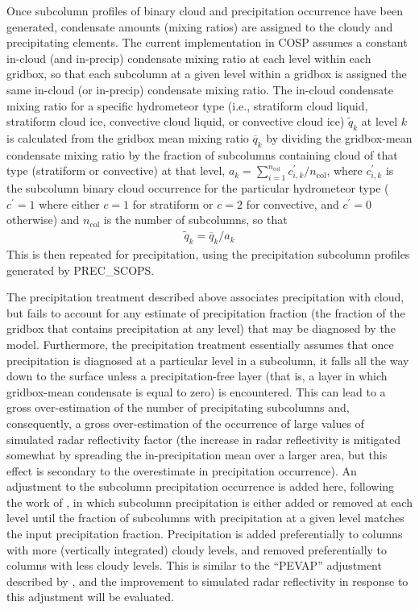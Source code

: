 Once subcolumn profiles of binary cloud and precipitation occurrence
have been generated, condensate amounts (mixing ratios) are assigned to
the cloudy and precipitating elements. The current implementation in
COSP assumes a constant in-cloud (and in-precip) condensate mixing ratio
at each level within each gridbox, so that each subcolumn at a given
level within a gridbox is assigned the same in-cloud (or in-precip)
condensate mixing ratio. The in-cloud condensate mixing ratio for a
specific hydrometeor type (i.e., stratiform cloud liquid, stratiform
cloud ice, convective cloud liquid, or convective cloud ice)
\(\tilde{q}_k\) at level \(k\) is calculated from the gridbox mean
mixing ratio \(\overline{q}_k\) by dividing the gridbox-mean condensate
mixing ratio by the fraction of subcolumns containing cloud of that type
(stratiform or convective) at that level,
\(a_k = \sum_{i = 1}^{n_\textrm{col}} c^\prime_{i, k} / n_\textrm{col}\),
where \(c^{\prime}_{i, k}\) is the subcolumn binary cloud occurrence for
the particular hydrometeor type (\(c^\prime = 1\) where either \(c = 1\)
for stratiform or \(c = 2\) for convective, and \(c^\prime = 0\)
otherwise) and \(n_\textrm{col}\) is the number of subcolumns, so that
\[\begin{gathered} 
    \tilde{q}_k = \overline{q}_k / a_k
\end{gathered}\] This is then repeated for precipitation, using the
precipitation subcolumn profiles generated by PREC\_SCOPS.

The precipitation treatment described above associates precipitation
with cloud, but fails to account for any estimate of precipitation
fraction (the fraction of the gridbox that contains precipitation at any
level) that may be diagnosed by the model. Furthermore, the
precipitation treatment essentially assumes that once precipitation is
diagnosed at a particular level in a subcolumn, it falls all the way
down to the surface unless a precipitation-free layer (that is, a layer
in which gridbox-mean condensate is equal to zero) is encountered. This
can lead to a gross over-estimation of the number of precipitating
subcolumns and, consequently, a gross over-estimation of the occurrence
of large values of simulated radar reflectivity factor (the increase in
radar reflectivity is mitigated somewhat by spreading the
in-precipitation mean over a larger area, but this effect is secondary
to the overestimate in precipitation occurrence). An adjustment to the
subcolumn precipitation occurrence is added here, following the work of
\citet{dimichele_et_al_2012}, in which subcolumn precipitation is either
added or removed at each level until the fraction of subcolumns with
precipitation at a given level matches the input precipitation fraction.
Precipitation is added preferentially to columns with more (vertically
integrated) cloudy levels, and removed preferentially to columns with
less cloudy levels. This is similar to the ``PEVAP'' adjustment
described by \citet{dimichele_et_al_2012}, and the improvement to
simulated radar reflectivity in response to this adjustment will be
evaluated.

